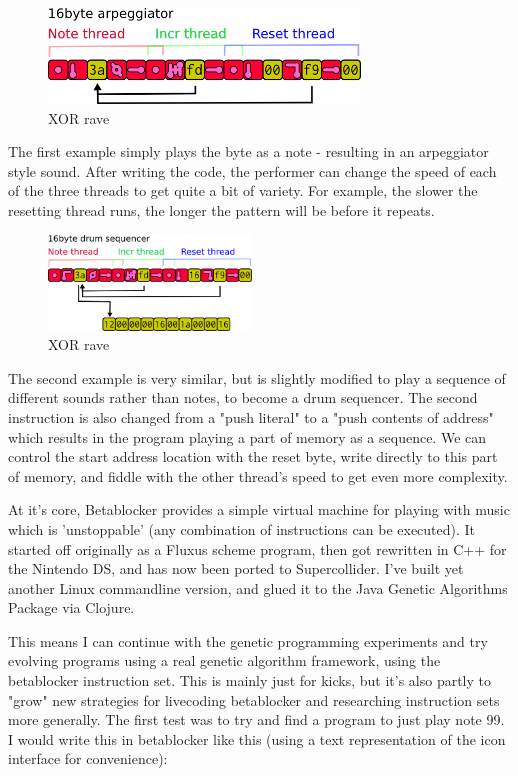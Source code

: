 \documentclass[letterpaper, 12pt]{article}
\begin{document}
\begin{figure}
	\centering
		\includegraphics[height=1in]{bbds-arp}
	\caption{XOR rave}
	\label{fig:fig_bbds-arp}
\end{figure}

The first example simply plays the byte as a note - resulting in an arpeggiator style sound. After writing the code, the performer can change the speed of each of the three threads to get quite a bit of variety. For example, the slower the resetting thread runs, the longer the pattern will be before it repeats.

\begin{figure}
	\centering
		\includegraphics[height=1in]{bbds-seq}
	\caption{XOR rave}
	\label{fig:fig_bbds-seq}
\end{figure}

The second example is very similar, but is slightly modified to play a sequence of different sounds rather than notes, to become a drum sequencer. The second instruction is also changed from a "push literal" to a "push contents of address" which results in the program playing a part of memory as a sequence. We can control the start address location with the reset byte, write directly to this part of memory, and fiddle with the other thread's speed to get even more complexity.



At it's core, Betablocker provides a simple virtual machine for playing with music which is 'unstoppable' (any combination of instructions can be executed). It started off originally as a Fluxus scheme program, then got rewritten in C++ for the Nintendo DS, and has now been ported to Supercollider. I've built yet another Linux commandline version, and glued it to the Java Genetic Algorithms Package via Clojure.

This means I can continue with the genetic programming experiments and try evolving programs using a real genetic algorithm framework, using the betablocker instruction set. This is mainly just for kicks, but it's also partly to "grow" new strategies for livecoding betablocker and researching instruction sets more generally.
The first test was to try and find a program to just play note 99. I would write this in betablocker like this (using a text representation of the icon interface for convenience):
\end{document}
